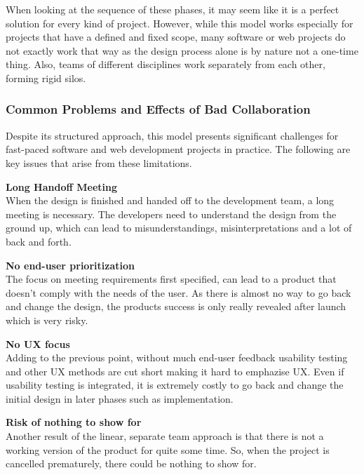 When looking at the sequence of these phases, it may seem like it is a perfect solution for every kind
of project. However, while this model works especially for projects that have a defined and fixed
scope, many software or web projects do not exactly work that way as the design process alone is by
nature not a one-time thing. Also, teams of different disciplines work separately from each other,
forming rigid silos. 

\subsubsection{Common Problems and Effects of Bad Collaboration}
Despite its structured approach, this model presents significant challenges for fast-paced software
and web development projects in practice. The following are key issues that arise from these
limitations.

\textbf{Long Handoff Meeting} \\
When the design is finished and handed off to the development team, a long meeting is necessary. The
developers need to understand the design from the ground up, which can lead to misunderstandings,
misinterpretations and a lot of back and forth.

\textbf{No end-user prioritization} \\
The focus on meeting requirements first specified, can lead to a product that doesn't comply with
the needs of the user. As there is almost no way to go back and change the design, the products 
success is only really revealed after launch which is very risky.

\textbf{No UX focus} \\
Adding to the previous point, without much end-user feedback usability testing and other UX methods
are cut short making it hard to emphazise UX. Even if usability testing is integrated, it is
extremely costly to go back and change the initial design in later phases such as
implementation.
 
\textbf{Risk of nothing to show for} \\
Another result of the linear, separate team approach is that there is not a working version of the
product for quite some time. So, when the project is cancelled prematurely, there could be nothing
to show for.\\
